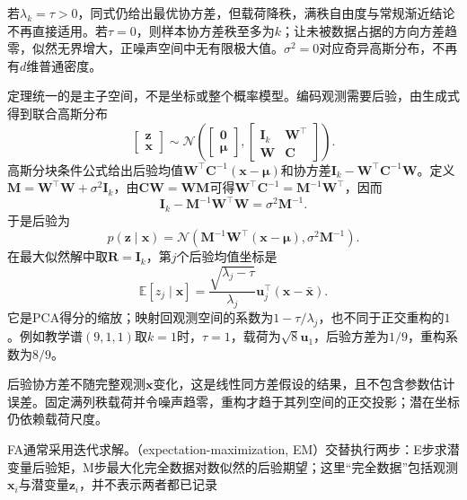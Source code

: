 若$\lambda_k=\tau>0$，同式仍给出最优协方差，但载荷降秩，满秩自由度与常规渐近结论不再直接适用。若$\tau=0$，则样本协方差秩至多为$k$；让未被数据占据的方向方差趋零，似然无界增大，正噪声空间中无有限极大值。$\sigma^2=0$对应奇异高斯分布，不再有$d$维普通密度。

定理统一的是主子空间，不是坐标或整个概率模型。编码观测需要后验，由生成式得到联合高斯分布
\begin{equation}
\label{eq:dim-ppca-joint}
\begin{bmatrix}\bm{z}\\ \bm{x}\end{bmatrix}
\sim\mathcal{N}\left(
\begin{bmatrix}\bm{0}\\ \bm{\mu}\end{bmatrix},
\begin{bmatrix}
\bm{I}_k&\bm{W}^\top\\
\bm{W}&\bm{C}
\end{bmatrix}\right).
\end{equation}
高斯分块条件公式给出后验均值$\bm{W}^\top\bm{C}^{-1}(\bm{x}-\bm{\mu})$和协方差$\bm{I}_k-\bm{W}^\top\bm{C}^{-1}\bm{W}$。定义$\bm{M}=\bm{W}^\top\bm{W}+\sigma^2\bm{I}_k$，由$\bm{C}\bm{W}=\bm{W}\bm{M}$可得$\bm{W}^\top\bm{C}^{-1}=\bm{M}^{-1}\bm{W}^\top$，因而
\[
\bm{I}_k-\bm{M}^{-1}\bm{W}^\top\bm{W}
=\sigma^2\bm{M}^{-1}.
\]
于是后验为
\begin{equation}
\label{eq:dim-ppca-posterior}
p(\bm{z}\mid\bm{x})
=\mathcal{N}\left(
\bm{M}^{-1}\bm{W}^\top(\bm{x}-\bm{\mu}),
\sigma^2\bm{M}^{-1}\right).
\end{equation}
在最大似然解中取$\bm{R}=\bm{I}_k$，第$j$个后验均值坐标是
\begin{equation}
\label{eq:dim-ppca-score}
\mathbb{E}[z_j\mid\bm{x}]
=\frac{\sqrt{\lambda_j-\tau}}{\lambda_j}
\bm{u}_j^\top(\bm{x}-\bar{\bm{x}}).
\end{equation}
它是PCA得分的缩放；映射回观测空间的系数为$1-\tau/\lambda_j$，也不同于正交重构的$1$。例如教学谱$(9,1,1)$取$k=1$时，$\tau=1$，载荷为$\sqrt8\bm{u}_1$，后验方差为$1/9$，重构系数为$8/9$。

后验协方差不随完整观测$\bm{x}$变化，这是线性同方差假设的结果，且不包含参数估计误差。固定满列秩载荷并令噪声趋零，重构才趋于其列空间的正交投影；潜在坐标仍依赖载荷尺度。

FA通常采用迭代求解。（expectation-maximization, EM）交替执行两步：E步求潜变量后验矩，M步最大化完全数据对数似然的后验期望；这里“完全数据”包括观测$\bm{x}_i$与潜变量$\bm{z}_i$，并不表示两者都已记录

